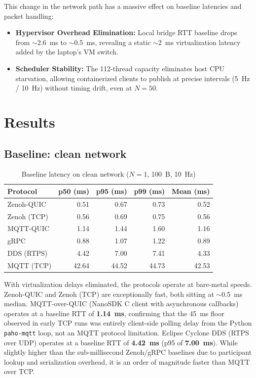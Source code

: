 \documentclass[11pt,a4paper]{article}
\begin{document}
This change in the network path has a massive effect on baseline latencies and packet handling:
\begin{itemize}
    \item \textbf{Hypervisor Overhead Elimination:} Local bridge RTT baseline drops from $\sim$2.6~ms to $\sim$0.5~ms, revealing a static $\sim$2~ms virtualization latency added by the laptop's VM switch.
    \item \textbf{Scheduler Stability:} The 112-thread capacity eliminates host CPU starvation, allowing containerized clients to publish at precise intervals (5~Hz / 10~Hz) without timing drift, even at $N=50$.
\end{itemize}

\section{Results}

\subsection{Baseline: clean network}

\begin{table}[H]
\centering
\caption{Baseline latency on clean network ($N=1$, 100~B, 10~Hz)}
\label{tab:clean}
\begin{tabular}{lrrrr}
\toprule
Protocol & p50 (ms) & p95 (ms) & p99 (ms) & Mean (ms) \\
\midrule
Zenoh-QUIC  & 0.51 & 0.67 & 0.73 & 0.52 \\
Zenoh (TCP) & 0.56 & 0.69 & 0.75 & 0.56 \\
MQTT-QUIC   & 1.14 & 1.44 & 1.60 & 1.16 \\
gRPC        & 0.88 & 1.07 & 1.22 & 0.89 \\
DDS (RTPS)  & 4.42 & 7.00 & 7.41 & 4.33 \\
MQTT (TCP)  & 42.64 & 44.52 & 44.73 & 42.53 \\
\bottomrule
\end{tabular}
\end{table}

With virtualization delays eliminated, the protocols operate at bare-metal speeds. Zenoh-QUIC and Zenoh (TCP) are exceptionally fast, both sitting at $\sim$0.5~ms median. MQTT-over-QUIC (NanoSDK C client with asynchronous callbacks) operates at a baseline RTT of \textbf{1.14~ms}, confirming that the 45~ms floor observed in early TCP runs was entirely client-side polling delay from the Python \texttt{paho-mqtt} loop, not an MQTT protocol limitation. Eclipse Cyclone DDS (RTPS over UDP) operates at a baseline RTT of \textbf{4.42~ms} (p95 of \textbf{7.00~ms}). While slightly higher than the sub-millisecond Zenoh/gRPC baselines due to participant lookup and serialization overhead, it is an order of magnitude faster than MQTT over TCP.
\end{document}
